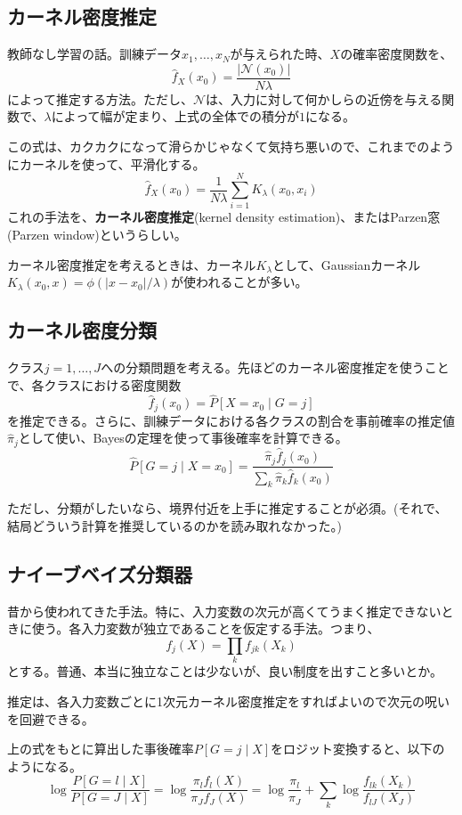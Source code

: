 \documentclass[uplatex]{jsarticle}
\begin{document}
\subsection{カーネル密度推定}
教師なし学習の話。訓練データ$x_{1},\dots,x_{N}$が与えられた時、$X$の確率密度関数を、
\[
  \hat{f}_{X}(x_{0})=\frac{|\mathcal{N}(x_{0})|}{N\lambda}
\]
によって推定する方法。ただし、$\mathcal{N}$は、入力に対して何かしらの近傍を与える関数で、$\lambda$によって幅が定まり、上式の全体での積分が$1$になる。

この式は、カクカクになって滑らかじゃなくて気持ち悪いので、これまでのようにカーネルを使って、平滑化する。
\[
  \hat{f}_{X}(x_{0})=\frac{1}{N\lambda}\sum_{i=1}^{N}K_{\lambda}(x_{0},x_{i})
\]
これの手法を、\textbf{カーネル密度推定}(kernel density estimation)、またはParzen窓(Parzen window)というらしい。

カーネル密度推定を考えるときは、カーネル$K_{\lambda}$として、Gaussianカーネル$K_{\lambda}(x_{0},x)=\phi(|x-x_{0}|/\lambda)$が使われることが多い。

\subsection{カーネル密度分類}
クラス$j=1,\dots,J$への分類問題を考える。先ほどのカーネル密度推定を使うことで、各クラスにおける密度関数
\[
  \hat{f}_{j}(x_{0})=\hat{P}[X=x_{0} \mid G=j]
\]
を推定できる。さらに、訓練データにおける各クラスの割合を事前確率の推定値$\hat{\pi}_{j}$として使い、Bayesの定理を使って事後確率を計算できる。
\[
  \hat{P}[G=j\mid X=x_{0}]=\frac{\hat{\pi}_{j}\hat{f}_{j}(x_{0})}{\sum_{k}\hat{\pi}_{k}\hat{f}_{k}(x_{0})}
\]

ただし、分類がしたいなら、境界付近を上手に推定することが必須。(それで、結局どういう計算を推奨しているのかを読み取れなかった。)

\subsection{ナイーブベイズ分類器}
昔から使われてきた手法。特に、入力変数の次元が高くてうまく推定できないときに使う。各入力変数が独立であることを仮定する手法。つまり、
\[
  f_{j}(X)=\prod_{k}f_{jk}(X_{k})
\]
とする。普通、本当に独立なことは少ないが、良い制度を出すこと多いとか。

推定は、各入力変数ごとに1次元カーネル密度推定をすればよいので次元の呪いを回避できる。

上の式をもとに算出した事後確率$P[G=j \mid X]$をロジット変換すると、以下のようになる。
\[
  \log \frac{P[G=l \mid X]}{P[G=J \mid X]}=\log\frac{\pi_{l}f_{l}(X)}{\pi_{J}f_{J}(X)}=\log\frac{\pi_{l}}{\pi_{J}}+\sum_{k}\log\frac{f_{lk}(X_k)}{f_{lJ}(X_J)}
\]
\end{document}
